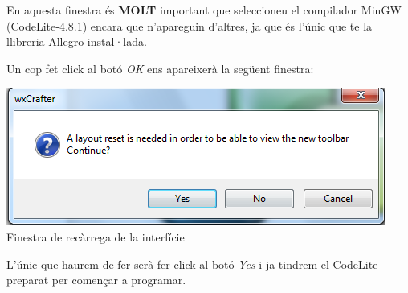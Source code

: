\documentclass[11pt]{article}
\begin{document}
\noindent En aquesta finestra és \textbf{MOLT} important que seleccioneu el compilador MinGW (CodeLite-4.8.1) encara que n'apareguin d'altres, ja que és l'únic que te la llibreria Allegro instal·lada.

\newpage
Un cop fet click al botó \textit{OK} ens apareixerà la següent finestra:

\begin{center}
	\includegraphics[scale=0.6]{img/Reload.png}\\
	 \small{Finestra de recàrrega de la interfície}
\end{center}

\noindent L'únic que haurem de fer serà fer click al botó \textit{Yes} i ja tindrem el CodeLite preparat per començar a programar.
\end{document}
